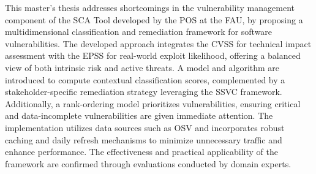 This master's thesis addresses shortcomings in the vulnerability management component of the \ac{SCA} Tool developed by the \ac{POS} at the \ac{FAU}, by proposing a multidimensional classification and remediation framework for software vulnerabilities. The developed approach integrates the \ac{CVSS} for technical impact assessment with the \ac{EPSS} for real-world exploit likelihood, offering a balanced view of both intrinsic risk and active threats. A model and algorithm are introduced to compute contextual classification scores, complemented by a stakeholder-specific remediation strategy leveraging the \ac{SSVC} framework. Additionally, a rank-ordering model prioritizes vulnerabilities, ensuring critical and data-incomplete vulnerabilities are given immediate attention. The implementation utilizes data sources such as \ac{OSV} and incorporates robust caching and daily refresh mechanisms to minimize unnecessary traffic and enhance performance. The effectiveness and practical applicability of the framework are confirmed through evaluations conducted by domain experts.